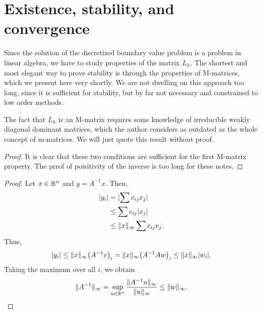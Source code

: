 \section{Existence, stability, and convergence}

\begin{intro}
  Since the solution of the discretized boundary value problem is a
  problem in linear algebra, we have to study properties of the matrix
  $L_h$. The shortest and most elegant way to prove stability is
  through the properties of M-matrices, which we present here very
  shortly. We are not dwelling on this approach too long, since it is
  sufficient for stability, but by far not necessary and constrained
  to low order methods.

  The fact that $L_h$ is an M-matrix requires some knowledge of
  irreducible weakly diagonal dominant matrices, which the author
  considers as outdated as the whole concept of m-matrices. We will
  just quote this result without proof.
\end{intro}





\begin{proof}
  It is clear that these two conditions are sufficient for the first
  M-matrix property. The prrof of poisitivity of the inverse is too
  long for these notes.
\end{proof}



\begin{proof}
  Let $x\in \mathbb R^n$ and $y = A^{-1} x$. Then,
  \begin{align*}
    \lvert y_i\rvert & = \lvert\sum c_{ij} x_j\rvert \\
    & \le \sum c_{ij} \lvert x_j\rvert \\
    & \le \lVert x\rVert_\infty \sum c_{ij} v_j.
  \end{align*}
  Thus,
  \begin{gather*}
    \lvert y_i\rvert \le  \lVert x\rVert_\infty \bigl(A^{-1} v\bigr)_i
    = \lVert x\rVert_\infty \bigl(A^{-1} Aw\bigr)_i \le \lVert x\rVert_\infty \lvert w_i\rvert.
  \end{gather*}
  Taking the maximum over all $i$, we obtain
  \begin{gather*}
    \lVert A^{-1}\rVert_\infty = \sup_{u\in
      \mathbb R^n}\frac{\lVert A^{-1}u\rVert_\infty}{\lVert u\rVert_\infty}
    \le \lVert w\rVert_\infty.
  \end{gather*}
\end{proof}

